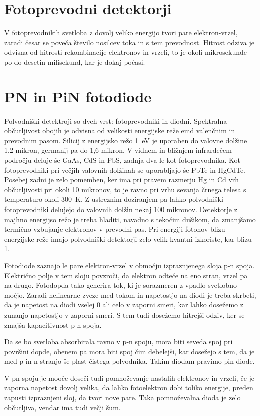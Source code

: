 \section{Fotoprevodni detektorji}
V fotoprevodnikih svetloba z dovolj veliko energijo tvori pare elektron-vrzel, zaradi  česar
se poveča število nosilcev toka in s tem prevodnost. Hitrost odziva je odvisna od hitrosti
rekombinacije elektronov in vrzeli, to je okoli mikrosekunde po do desetin milisekund, kar
je dokaj počasi. 

\section{PN in PiN fotodiode}
Polvodniški detektroji so dveh vrst: fotoprevodniki in diodni. Spektralna občutljivost
obojih je odvisna od velikosti energijske reže emd valenčnim in prevodnim pasom. Silicij
z energijsko režo 1~eV je uporaben do valovne dolžine 1,2 mikron, germanij pa do 1,6 mikron.
V vidnem in bližnjem infrardečem področju deluje še GaAs, CdS in PbS, zadnja dva le kot
fotoprevodnika. Kot fotoprevodniki pri večjih valovnih dolžinah se uporabljajo  še PbTe
in HgCdTe. Posebej zadni je zelo pomemben, ker ima pri pravem razmerju Hg in Cd vrh občutljivosti
pri okoli 10 mikronov, to je ravno pri vrhu sevanja črnega telesa s temperaturo okoli 300~K. 
Z ustreznim doziranjem pa lahko polvodniški fotoprevodniki delujejo do valovnih dolžin nekaj 100 mikronov.
Detektorje  z majhno energijso režo je treba hladiti, navadno s tekočim dušikom, da zmanjšamo
termično vzbujanje elektronov v prevodni pas. Pri energiji fotonov blizu energijske reže 
imajo polvodniški detektorji zelo velik kvantni izkoriste, kar blizu 1.

Fotodiode zaznajo le pare elektron-vrzel v območju izpraznjenega sloja p-n spoja. Električno 
polje v tem sloju povzroči, da elektron odteče na eno stran, vrzel pa na drugo. Fotodopda tako
generira tok, ki je sorazmeren z vpadlo svetlobno močjo. Zaradi nelinearne zveze med tokom in napetostjo
na diodi je treba skrbeti, da je napetost na diodi vselej 0 ali celo v zaporni smeri, kar lahko
dosežemo z zunanjo napetostjo v zaporni smeri. S tem tudi dosežemo hitrejši odziv, ker 
se zmajša kapacitivnost p-n spoja. 

Da se bo svetloba absorbirala ravno v p-n spoju, mora biti seveda spoj pri površini dopde, obenem
pa mora biti spoj čim debelejši, kar dosežejo s tem, da je med  p in n stranjo še plast
čistega polvodnika. Takim diodam pravimo pin diode. 

V pn spoju je mooče doseči tudi pomnoževanje nastalih elektronov in vrzeli, če je zaporna napetost dovolj 
velika, da lahko fotoelektron dobi toliko energije, preden zapusti izpraznjeni sloj, da tvori nove pare.
Taka pomnoževalna dioda je zelo občutljiva, vendar ima tudi večji šum.

